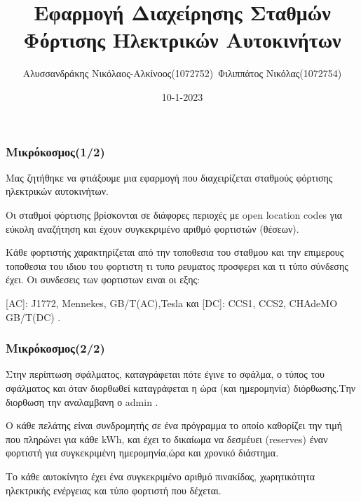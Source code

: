 \documentclass[10pt]{beamer}
\title{Εφαρμογή Διαχείρησης Σταθμών Φόρτισης Ηλεκτρικών Αυτοκινήτων}
\author{Αλυσσανδράκης Νικόλαος-Αλκίνοος(1072752)\newline ~Φιλιππάτος Νικόλας(1072754)}
\date{10-1-2023}
\begin{document}
\begin{frame}
    \titlepage
\end{frame}

\begin{frame}
    \frametitle{Μικρόκοσμος(1/2)}

    Μας ζητήθηκε να φτιάξουμε μια εφαρμογή που διαχειρίζεται σταθμούς φόρτισης ηλεκτρικών αυτοκινήτων.\newline

    Οι σταθμοί φόρτισης βρίσκονται σε διάφορες περιοχές με open location codes για εύκολη αναζήτηση και έχουν συγκεκριμένο αριθμό φορτιστών (θέσεων).\newline

    Κάθε φορτιστής χαρακτηρίζεται από την τοποθεσια του σταθμου και την επιμερους τοποθεσια του ιδιου του φορτιστη τι τυπο ρευματος προσφερει και τι τύπο σύνδεσης έχει. 
    Οι συνδεσεις των φορτιστων ειναι οι εξης: 

    [AC]: J1772, Mennekes, GB/T(AC),Tesla  και
    [DC]: CCS1, CCS2, CHAdeMO GB/T(DC) .\newline



\end{frame}

\begin{frame}
    \frametitle{Μικρόκοσμος(2/2)}
    
    Στην περίπτωση σφάλματος, καταγράφεται πότε έγινε το σφάλμα, ο τύπος του σφάλματος και όταν διορθωθεί καταγράφεται η ώρα (και ημερομηνία) διόρθωσης.Την διορθωση την αναλαμβανη ο admin . \newline

    Ο κάθε πελάτης είναι συνδρομητής σε ένα πρόγραμμα το οποίο καθορίζει την τιμή που πληρώνει για κάθε kWh, και έχει το δικαίωμα να δεσμέυει (reserves) έναν φορτιστή για συγκεκριμένη ημερομηνία,ώρα και χρονικό διάστημα.\newline

    Το κάθε αυτοκίνητο έχει ένα συγκεκριμένο αριθμό πινακίδας, χωρητικότητα ηλεκτρικής ενέργειας και τύπο φορτιστή που δέχεται.
\end{frame}
\end{document}

